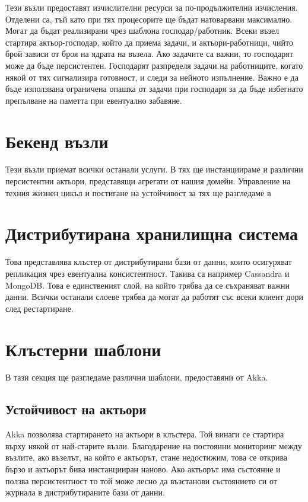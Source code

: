 Тези възли предоставят изчислителни ресурси за по-продължителни изчисления. Отделени са, тъй като при тях процесорите ще бъдат натоварвани максимално. Могат да бъдат реализирани чрез шаблона господар/работник. Всеки възел стартира актьор-господар, който да приема задачи, и актьори-работници, чийто брой зависи от броя на ядрата на възела. Ако задачите са важни, то господарят може да бъде персистентен. Господарят разпределя задачи на работниците, когато някой от тях сигнализира готовност, и следи за нейното изпълнение. Важно е да бъде използвана ограничена опашка от задачи при господаря за да бъде избегнато препълване на паметта при евентуално забавяне.

\section{Бекенд възли}

Тези възли приемат всички останали услуги. В тях ще инстанциираме и различни персистентни актьори, представящи агрегати от нашия домейн. Управление на техния жизнен цикъл и постигане на устойчивост за тях ще разгледаме в 

\section{Дистрибутирана хранилищна система}

Това представлява клъстер от дистрибутирани бази от данни, които осигуряват репликация чрез евентуална консистентност. Такива са например Cassandra и MongoDB. Това е единственият слой, на който трябва да се съхраняват важни данни. Всички останали слоеве трябва да могат да работят със всеки клиент дори след рестартиране.

\section{Клъстерни шаблони}

В тази секция ще разгледаме различни шаблони, предоставяни от Akka.

\subsection{Устойчивост на  актьори}

Akka позволява стартирането на  актьори в клъстера. Той винаги се стартира върху някой от най-старите възли. Благодарение на постоянни мониторинг между възлите, ако възелът, на който е актьорът, стане недостижим, това се открива бързо и актьорът бива инстанцииран наново. Ако актьорът има състояние и ползва персистентност то той може лесно да възстанови състоянието си от журнала в дистрибутираните бази от данни.

